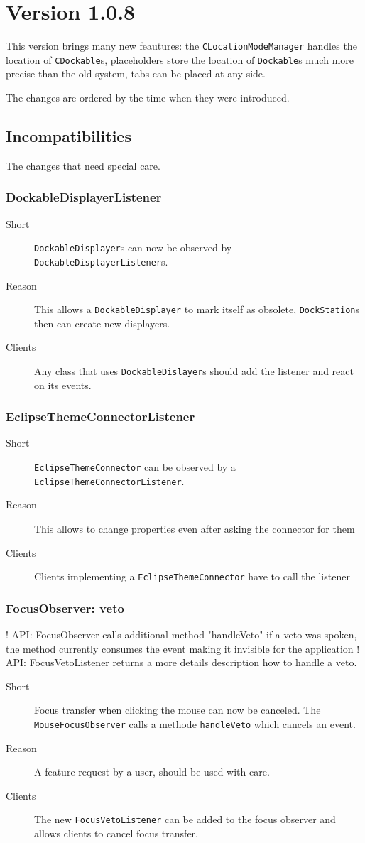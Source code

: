 \documentclass[a4paper,10pt]{article}
\newcommand{\src}[1]{\lstinline[basicstyle=\normalsize\ttfamily,keywordstyle=\normalsize\ttfamily,identifierstyle=\normalsize\ttfamily]|#1|}
\newcommand{\short}{\item[Short]}
\newcommand{\why}{\item[Reason]}
\newcommand{\clients}{\item[Clients]}
\begin{document}
\section{Version 1.0.8}
This version brings many new feautures: the \src{CLocationModeManager} handles the location of \src{CDockable}s, placeholders store the location of \src{Dockable}s much more precise than the old system, tabs can be placed at any side.

The changes are ordered by the time when they were introduced.

\subsection{Incompatibilities}
The changes that need special care.

\subsubsection{DockableDisplayerListener}
\begin{description}
 \short \src{DockableDisplayer}s can now be observed by \src{DockableDisplayerListener}s.
 \why This allows a \src{DockableDisplayer} to mark itself as obsolete, \src{DockStation}s then can create new displayers.
 \clients Any class that uses \src{DockableDislayer}s should add the listener and react on its events.
\end{description}

\subsubsection{EclipseThemeConnectorListener}
\begin{description}
 \short \src{EclipseThemeConnector} can be observed by a \src{EclipseThemeConnectorListener}.
 \why This allows to change properties even after asking the connector for them
 \clients Clients implementing a \src{EclipseThemeConnector} have to call the listener
\end{description}

\subsubsection{FocusObserver: veto}
! API: FocusObserver calls additional method "handleVeto" if a veto was spoken, the method currently consumes the event making it invisible for the application
! API: FocusVetoListener returns a more details description how to handle a veto.
\begin{description}
 \short Focus transfer when clicking the mouse can now be canceled. The \src{MouseFocusObserver} calls a methode \src{handleVeto} which cancels an event.
 \why A feature request by a user, should be used with care.
 \clients The new \src{FocusVetoListener} can be added to the focus observer and allows clients to cancel focus transfer.
\end{description}
\end{document}
